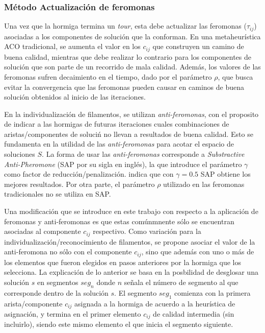 \subsubsection{M\'etodo Actualizaci\'on de feromonas}
\label{subsec:pheroUpdate}
Una vez que la hormiga termina un {\it tour}, esta debe actualizar las feromonas ($\tau_{ij}$) asociadas a los componentes de soluci\'on que la conforman. En una metaheur\'istica ACO tradicional, se aumenta el valor en los $c_{ij}$ que construyen un camino de buena calidad, mientras que debe realizar lo contrario para los componentes de soluci\'on que son parte de un recorrido de mala calidad. Adem\'as, los valores de las feromonas sufren decaimiento en el tiempo, dado por el par\'ametro $\rho$, que busca evitar la convergencia que las feromonas pueden causar en caminos de buena soluci\'on obtenidos al inicio de las iteraciones.


En la individualizaci\'on de filamentos, se utilizan {\it anti-feromonas}, con el proposito de indicar a las hormigas de futuras iteraciones cuales combinaciones de aristas/componentes de soluci\'n no llevan a resultados de buena calidad. Esto se fundamenta en la utilidad de las {\it anti-feromonas} para acotar el espacio de soluciones $S$. La forma de usar las {\it anti-feromonas} corresponde a {\it Substractive Anti-Pheromone} (SAP por su sigla en ingl\'es), la que introduce el par\'ametro $\gamma$ como factor de reducci\'on/penalizaci\'on. \cite{montgomery2002anti} indica que con $\gamma = 0.5$ SAP obtiene los mejores resultados. Por otra parte, el par\'ametro $\rho$ utilizado en las feromonas tradicionales no se utiliza en SAP.


Una modificaci\'on que se introduce en este trabajo con respecto a la aplicaci\'on de  feromonas y anti-feromonas es que estas com\'unmnente s\'olo se encuentran asociadas al componente $c_{ij}$ respectivo. Como variaci\'on para la individualizaci\'on/reconocimiento de filamentos, se propone asociar el valor de la anti-feromona no s\'olo con el componente $c_{ij}$, sino que adem\'as con uno o m\'as de los elementos que fueron elegidos en pasos anteriores por la hormiga que los selecciona. La explicaci\'on de lo anterior se basa en la posbilidad de desglosar una soluci\'on $s$ en segmentos $seg_{n}$ donde $n$ se\~nala el n\'umero de segmento al que corresponde dentro de la soluci\'on $s$. El segmento $seg_1$ comienza con la primera arista/componente $c_{ij}$ asignada a la hormiga de acuerdo a la heur\'istica de asignaci\'on, y termina en el primer elemento $c_{ij}$ de calidad intermedia (sin incluirlo), siendo este mismo elemento el que inicia el segmento siguiente.


